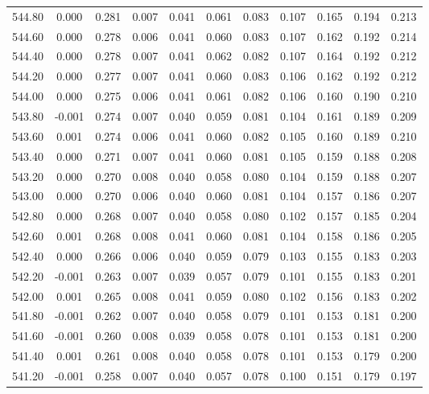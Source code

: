 \begin{longtable}{cccccccccc}
    544.80 &  0.000 &  0.281 &  0.007 &  0.041 &  0.061 &  0.083 &  0.107 &  0.165 &  0.194 &  0.213 \\
    544.60 &  0.000 &  0.278 &  0.006 &  0.041 &  0.060 &  0.083 &  0.107 &  0.162 &  0.192 &  0.214 \\
    544.40 &  0.000 &  0.278 &  0.007 &  0.041 &  0.062 &  0.082 &  0.107 &  0.164 &  0.192 &  0.212 \\
    544.20 &  0.000 &  0.277 &  0.007 &  0.041 &  0.060 &  0.083 &  0.106 &  0.162 &  0.192 &  0.212 \\
    544.00 &  0.000 &  0.275 &  0.006 &  0.041 &  0.061 &  0.082 &  0.106 &  0.160 &  0.190 &  0.210 \\
    543.80 & -0.001 &  0.274 &  0.007 &  0.040 &  0.059 &  0.081 &  0.104 &  0.161 &  0.189 &  0.209 \\
    543.60 &  0.001 &  0.274 &  0.006 &  0.041 &  0.060 &  0.082 &  0.105 &  0.160 &  0.189 &  0.210 \\
    543.40 &  0.000 &  0.271 &  0.007 &  0.041 &  0.060 &  0.081 &  0.105 &  0.159 &  0.188 &  0.208 \\
    543.20 &  0.000 &  0.270 &  0.008 &  0.040 &  0.058 &  0.080 &  0.104 &  0.159 &  0.188 &  0.207 \\
    543.00 &  0.000 &  0.270 &  0.006 &  0.040 &  0.060 &  0.081 &  0.104 &  0.157 &  0.186 &  0.207 \\
    542.80 &  0.000 &  0.268 &  0.007 &  0.040 &  0.058 &  0.080 &  0.102 &  0.157 &  0.185 &  0.204 \\
    542.60 &  0.001 &  0.268 &  0.008 &  0.041 &  0.060 &  0.081 &  0.104 &  0.158 &  0.186 &  0.205 \\
    542.40 &  0.000 &  0.266 &  0.006 &  0.040 &  0.059 &  0.079 &  0.103 &  0.155 &  0.183 &  0.203 \\
    542.20 & -0.001 &  0.263 &  0.007 &  0.039 &  0.057 &  0.079 &  0.101 &  0.155 &  0.183 &  0.201 \\
    542.00 &  0.001 &  0.265 &  0.008 &  0.041 &  0.059 &  0.080 &  0.102 &  0.156 &  0.183 &  0.202 \\
    541.80 & -0.001 &  0.262 &  0.007 &  0.040 &  0.058 &  0.079 &  0.101 &  0.153 &  0.181 &  0.200 \\
    541.60 & -0.001 &  0.260 &  0.008 &  0.039 &  0.058 &  0.078 &  0.101 &  0.153 &  0.181 &  0.200 \\
    541.40 &  0.001 &  0.261 &  0.008 &  0.040 &  0.058 &  0.078 &  0.101 &  0.153 &  0.179 &  0.200 \\
    541.20 & -0.001 &  0.258 &  0.007 &  0.040 &  0.057 &  0.078 &  0.100 &  0.151 &  0.179 &  0.197 \\

\end{longtable}
